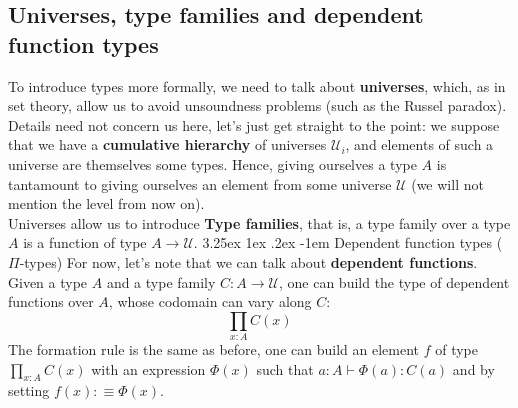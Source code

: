 \documentclass{report}
\makeatletter
\renewcommand\paragraph{\@startsection{paragraph}{5}{\z@}%
  {3.25ex \@plus1ex \@minus.2ex}%
  {-1em}%
  {\normalfont\normalsize\bfseries}}
\makeatother
\begin{document}
\subsection{Universes, type families and dependent function types}
To introduce types more formally, we need to talk about \textbf{universes}, which, as in set theory, allow us to avoid unsoundness problems (such as the Russel paradox). Details need not concern us here, let's just get straight to the point: we suppose that we have a \textbf{cumulative hierarchy} of universes $\mathcal{U}_i$, and elements of such a universe are themselves some types. Hence, giving ourselves a type $A$ is tantamount to giving ourselves an element from some universe $\mathcal{U}$ (we will not mention the level from now on).\\
 Universes allow us to introduce \textbf{Type families}, that is, a type family over a type $A$ is a function of type $A \to \mathcal{U}$.
 \paragraph{Dependent function types ($\Pi$-types)}
 For now, let's note that we can talk about \textbf{dependent functions}. Given a type $A$ and a type family $C: A \rightarrow \mathcal{U}$, one can build the type of dependent functions over $A$, whose codomain can vary along $C$: 
$$\prod_{x : A} C(x)$$
The formation rule is the same as before, one can build an element $f$ of type $\prod_{x : A} C(x)$ with an expression $\Phi(x)$ such that $a : A \vdash \Phi(a) : C(a)$ and by setting $f(x) :\equiv \Phi(x)$.
\end{document}
